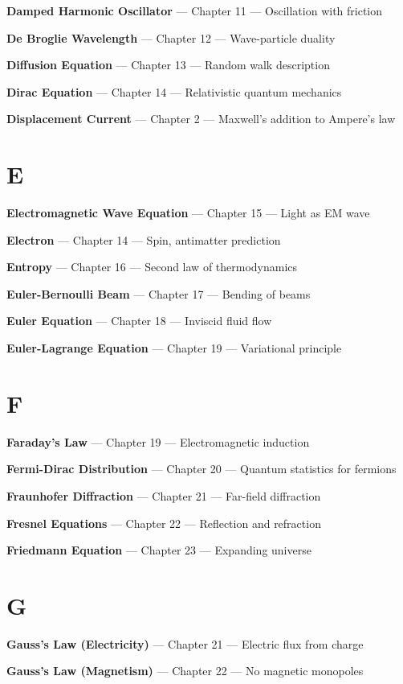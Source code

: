 \textbf{Damped Harmonic Oscillator} --- Chapter 11 --- Oscillation with friction

\textbf{De Broglie Wavelength} --- Chapter 12 --- Wave-particle duality

\textbf{Diffusion Equation} --- Chapter 13 --- Random walk description

\textbf{Dirac Equation} --- Chapter 14 --- Relativistic quantum mechanics

\textbf{Displacement Current} --- Chapter 2 --- Maxwell's addition to Ampere's law

\section*{E}

\textbf{Electromagnetic Wave Equation} --- Chapter 15 --- Light as EM wave

\textbf{Electron} --- Chapter 14 --- Spin, antimatter prediction

\textbf{Entropy} --- Chapter 16 --- Second law of thermodynamics

\textbf{Euler-Bernoulli Beam} --- Chapter 17 --- Bending of beams

\textbf{Euler Equation} --- Chapter 18 --- Inviscid fluid flow

\textbf{Euler-Lagrange Equation} --- Chapter 19 --- Variational principle

\section*{F}

\textbf{Faraday's Law} --- Chapter 19 --- Electromagnetic induction

\textbf{Fermi-Dirac Distribution} --- Chapter 20 --- Quantum statistics for fermions

\textbf{Fraunhofer Diffraction} --- Chapter 21 --- Far-field diffraction

\textbf{Fresnel Equations} --- Chapter 22 --- Reflection and refraction

\textbf{Friedmann Equation} --- Chapter 23 --- Expanding universe

\section*{G}

\textbf{Gauss's Law (Electricity)} --- Chapter 21 --- Electric flux from charge

\textbf{Gauss's Law (Magnetism)} --- Chapter 22 --- No magnetic monopoles


